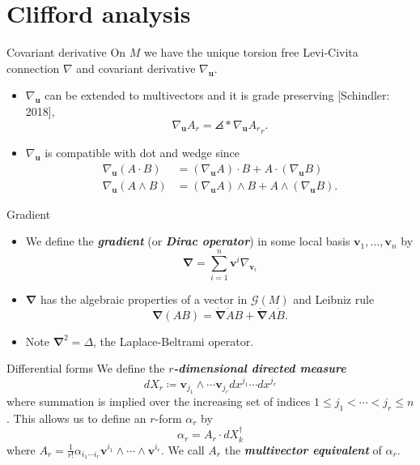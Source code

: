\documentclass[aspectratio=169,handout]{beamer}
\newcommand\boldgreen[1]{\textcolor{lighter_csu_green}{\emph{\textbf{#1}}}}
\newcommand{\grad}{\boldsymbol{\nabla}}
\newcommand{\G}{\mathcal{G}}
\newcommand{\blade}[1]{\boldsymbol{#1}}
\DeclarePairedDelimiter\angles{\langle}{\rangle}
\newcommand{\proj}[2]{\angles*{#2}_{#1}}
\begin{document}
\section{Clifford analysis}

\begin{frame}{Covariant derivative}
\vfill
    On $M$ we have the unique torsion free Levi-Civita connection $\nabla$ and covariant derivative $\nabla_{\blade{u}}$.
    \pause
    \begin{itemize}
        \pause
        \item $\nabla_{\blade{u}}$ can be extended to multivectors and it is grade preserving [Schindler: 2018],
        \[
        \nabla_{\blade{u}} A_r = \proj{r}{\nabla_{\blade{u}} A_r}.
        \]
        \pause
        \item $\nabla_{\blade{u}}$ is compatible with dot and wedge since
        \begin{align*}
        \nabla_{\blade{u}}(A\cdot B) &= (\nabla_{\blade{u}} A)\cdot B + A \cdot (\nabla_{\blade{u}} B)\\
        \nabla_{\blade{u}}(A\wedge B) &= (\nabla_{\blade{u}} A) \wedge B + A \wedge (\nabla_{\blade{u}} B).
        \end{align*}
    \end{itemize}
\vfill
\end{frame}

\begin{frame}{Gradient}
\vfill
\begin{itemize}
    \pause
    \item We define the \boldgreen{gradient} (or \boldgreen{Dirac operator}) in some local basis $\blade{v}_1,\dots,\blade{v}_n$ by
    \[
    \grad = \sum_{i=1}^n \blade{v}^i \nabla_{\blade{v}_i}
    \]
    \pause
    \item $\grad$ has the algebraic properties of a vector in $\G(M)$ and Leibniz rule
    \[
    \grad(AB) = \dot{\grad}\dot{A}B + \dot{\grad}A\dot{B}.
    \]
    \pause
    \item Note $\grad^2=\Delta$, the Laplace-Beltrami operator.
\end{itemize}
\vfill
\end{frame}

\begin{frame}{Differential forms}
\vfill
    We define the \boldgreen{$r$-dimensional directed measure}
    \[
    dX_r\coloneqq \blade{v}_{j_1} \wedge \cdots \blade{v}_{j_r} dx^{j_1} \cdots dx^{j_r}
    \]
    where summation is implied over the increasing set of indices $1\leq j_1<\cdots<j_r\leq n$. This allows us to define an $r$-form $\alpha_r$ by
    \[
    \alpha_r = A_r \cdot dX_k^\dagger
    \]
    where $A_r = \frac{1}{r!} \alpha_{i_1 \cdots i_r} \blade{v}^{i_1} \wedge \cdots \wedge \blade{v}^{i_r}$. We call $A_r$ the \boldgreen{multivector equivalent} of $\alpha_r$.
\vfill
\end{frame}
\end{document}
